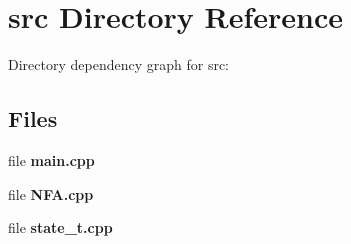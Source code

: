\section{src Directory Reference}
\label{dir_68267d1309a1af8e8297ef4c3efbcdba}
Directory dependency graph for src\+:
\subsection*{Files}
\begin{DoxyCompactItemize}
\item 
file \textbf{ main.\+cpp}
\item 
file \textbf{ N\+F\+A.\+cpp}
\item 
file \textbf{ state\+\_\+t.\+cpp}
\end{DoxyCompactItemize}
